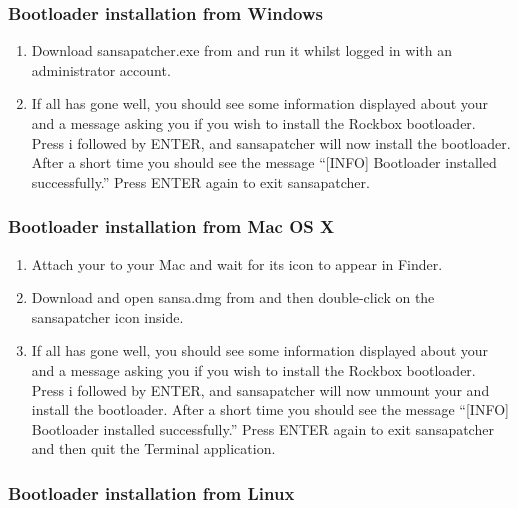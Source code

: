 \subsubsection{Bootloader installation from Windows}

\begin{enumerate}

\item Download sansapatcher.exe from 
and run it whilst logged in with an administrator account.

\item If all has gone well, you should see some information displayed about
your \archosplayertype{} and a message asking you if you wish to install the Rockbox
bootloader. Press i followed by ENTER, and sansapatcher will now
install the bootloader. After a short time you should see the message
``[INFO] Bootloader installed successfully.'' Press ENTER again to exit
sansapatcher.
\end{enumerate}

\subsubsection{Bootloader installation from Mac OS X}

\begin{enumerate}

\item Attach your \dap{} to your Mac and wait for its icon to appear in 
Finder.

\item Download and open sansa.dmg from 
and then double-click on the sansapatcher icon inside. 

\item If all has gone well, you should see some
information displayed about your \dap{} and a message asking you if you 
wish to install the Rockbox bootloader. Press i followed by ENTER, and 
sansapatcher will now unmount your \dap{} and install the bootloader. 
After a short time you should see the message ``[INFO] Bootloader installed successfully.''
Press ENTER again to exit sansapatcher and then quit the Terminal application.
\end{enumerate}

\subsubsection{Bootloader installation from Linux}

